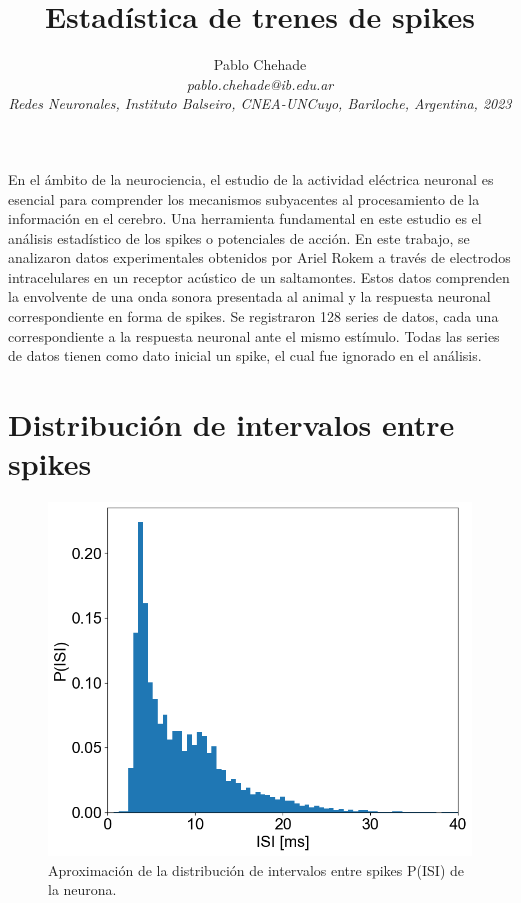 \documentclass[aps,prb,twocolumn,superscriptaddress,floatfix,longbibliography]{revtex4-2}
\newcounter{para}
\begin{document}
\newcommand{\mytitle}{Estadística de trenes de spikes}

\title{\mytitle}

\author{Pablo Chehade \\
    \small \textit{pablo.chehade@ib.edu.ar} \\
    \small \textit{Redes Neuronales, Instituto Balseiro, CNEA-UNCuyo, Bariloche, Argentina, 2023} \\}
    
    
    
\maketitle

En el ámbito de la neurociencia, el estudio de la actividad eléctrica neuronal es esencial para comprender los mecanismos subyacentes al procesamiento de la información en el cerebro. Una herramienta fundamental en este estudio es el análisis estadístico de los spikes o potenciales de acción. En este trabajo, se analizaron datos experimentales obtenidos por Ariel Rokem a través de electrodos intracelulares en un receptor acústico de un saltamontes. Estos datos comprenden la envolvente de una onda sonora presentada al animal y la respuesta neuronal correspondiente en forma de spikes. Se registraron 128 series de datos, cada una correspondiente a la respuesta neuronal ante el mismo estímulo. Todas las series de datos tienen como dato inicial un spike, el cual fue ignorado en el análisis.

\section{Distribución de intervalos entre spikes}

\begin{figure}[h]
  \includegraphics[clip=true,width=0.9\columnwidth]{ISI_histogram.png}
  \caption{Aproximación de la distribución de intervalos entre spikes P(ISI) de la neurona.}
   \label{fig:ISI_histogram}
\end{figure}
\end{document}
